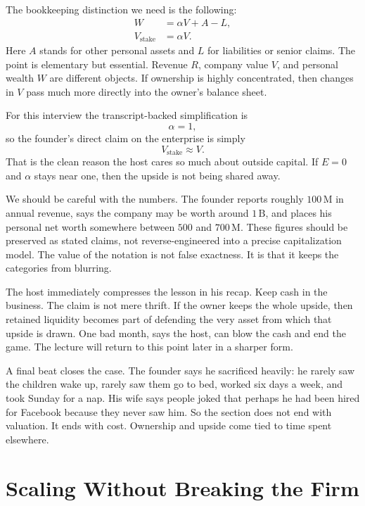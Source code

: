 The bookkeeping distinction we need is the following:
\begin{align}
W &= \alpha V + A - L, \\
V_{\text{stake}} &= \alpha V.
\end{align}
Here $A$ stands for other personal assets and $L$ for liabilities or senior claims. The point is elementary but essential. Revenue $R$, company value $V$, and personal wealth $W$ are different objects. If ownership is highly concentrated, then changes in $V$ pass much more directly into the owner's balance sheet.

For this interview the transcript-backed simplification is
\begin{equation}
\alpha = 1,
\end{equation}
so the founder's direct claim on the enterprise is simply
\begin{equation}
V_{\text{stake}} \approx V.
\end{equation}
That is the clean reason the host cares so much about outside capital. If $E=0$ and $\alpha$ stays near one, then the upside is not being shared away.

We should be careful with the numbers. The founder reports roughly $100\,\mathrm{M}$ in annual revenue, says the company may be worth around $1\,\mathrm{B}$, and places his personal net worth somewhere between $500$ and $700\,\mathrm{M}$. These figures should be preserved as stated claims, not reverse-engineered into a precise capitalization model. The value of the notation is not false exactness. It is that it keeps the categories from blurring.

The host immediately compresses the lesson in his recap. Keep cash in the business. The claim is not mere thrift. If the owner keeps the whole upside, then retained liquidity becomes part of defending the very asset from which that upside is drawn. One bad month, says the host, can blow the cash and end the game. The lecture will return to this point later in a sharper form.

A final beat closes the case. The founder says he sacrificed heavily: he rarely saw the children wake up, rarely saw them go to bed, worked six days a week, and took Sunday for a nap. His wife says people joked that perhaps he had been hired for Facebook because they never saw him. So the section does not end with valuation. It ends with cost. Ownership and upside come tied to time spent elsewhere.

\section{Scaling Without Breaking the Firm}

